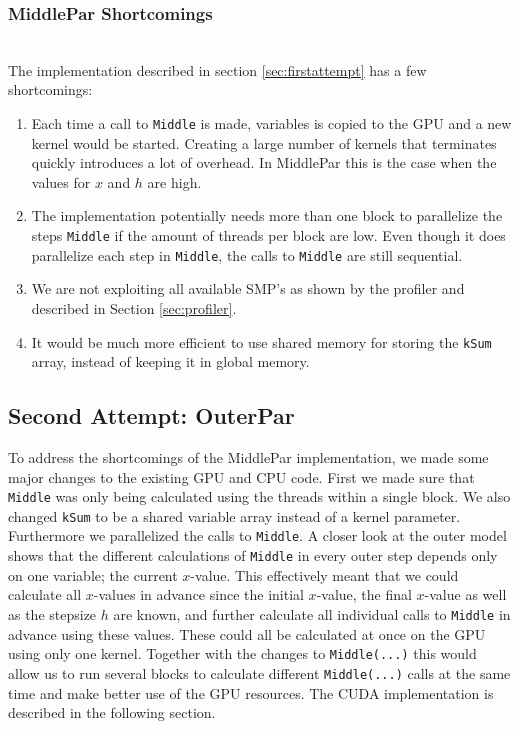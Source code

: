 \subsubsection{MiddlePar Shortcomings} \hfill \\
\label{label:shortages}
The implementation described in section \ref{sec:firstattempt} has a few shortcomings:
\begin{enumerate}
	\item Each time a call to \texttt{Middle} is made, variables is copied to the GPU and a new kernel would be started. Creating a large number of kernels that terminates quickly introduces a lot of overhead. In MiddlePar this is the case when the values for $x$ and $h$ are high.
	\item The implementation potentially needs more than one block to parallelize the steps \texttt{Middle} if the amount of threads per block are low. Even though it does parallelize each step in \texttt{Middle}, the calls to \texttt{Middle} are still sequential.
	\item We are not exploiting all available SMP's as shown by the profiler and described in Section \ref{sec:profiler}.
	\item It would be much more efficient to use shared memory for storing the \texttt{kSum} array, instead of keeping it in global memory.
\end{enumerate}

\subsection{Second Attempt: OuterPar}
To address the shortcomings of the MiddlePar implementation, we made some major changes to the existing GPU and CPU code. First we made sure that \texttt{Middle} was only being calculated using the threads within a single block. We also changed \texttt{kSum} to be a shared variable array instead of a kernel parameter. \\

Furthermore we parallelized the calls to \texttt{Middle}. A closer look at the outer model shows that the different calculations of \texttt{Middle} in every outer step depends only on one variable; the current $x$-value. This effectively meant that we could calculate all $x$-values in advance since the initial $x$-value, the final $x$-value as well as the stepsize $h$ are known, and further calculate all individual calls to \texttt{Middle} in advance using these values. These could all be calculated at once on the GPU using only one kernel. Together with the changes to \texttt{Middle(...)} this would allow us to run several blocks to calculate different \texttt{Middle(...)} calls at the same time and make better use of the GPU resources. The CUDA implementation is described in the following section.

